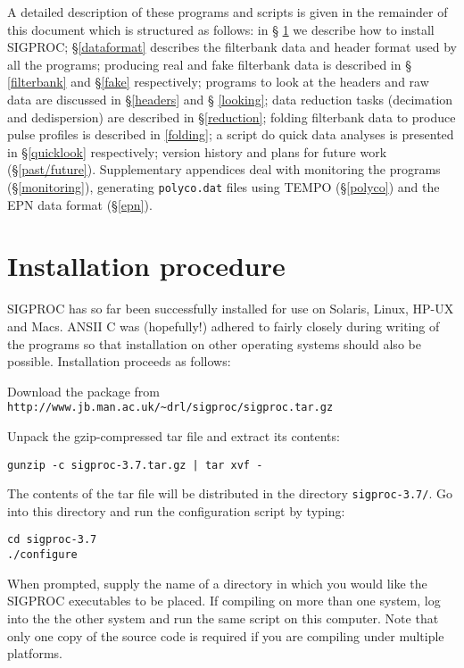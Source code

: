 \documentclass[11pt]{article}
\begin{document}
A detailed description of these programs and scripts is given in the
remainder of this document which is structured as follows: in \S
\ref{install} we describe how to install SIGPROC; \S \ref{dataformat}
describes the filterbank data and header format used by all the
programs; producing real and fake filterbank data is described in \S
\ref{filterbank} and \S \ref{fake} respectively; programs to look at
the headers and raw data are discussed in \S \ref{headers} and \S
\ref{looking}; data reduction tasks (decimation and dedispersion) are
described in \S \ref{reduction}; folding filterbank data to produce
pulse profiles is described in \ref{folding}; a script do quick data
analyses is presented in \S \ref{quicklook} respectively; version
history and plans for future work (\S \ref{past/future}). 
Supplementary appendices deal with
monitoring the programs (\S \ref{monitoring}), 
generating {\tt polyco.dat} files using {\sc TEMPO}
(\S \ref{polyco}) and the EPN data format (\S \ref{epn}).

\section{Installation procedure}
\label{install}
SIGPROC has so far been successfully installed for use on Solaris,
Linux, HP-UX and Macs.
ANSII C was (hopefully!)  adhered to fairly closely
during writing of the programs so that installation on other operating
systems should also be possible.  Installation proceeds as follows:

Download the package from 
\verb+http://www.jb.man.ac.uk/~drl/sigproc/sigproc.tar.gz+

Unpack the gzip-compressed tar file and extract its contents:

\noindent 
{\tt gunzip -c sigproc-3.7.tar.gz | tar xvf -}

The contents of the tar file will be distributed in the directory
{\tt sigproc-3.7/}. Go into this directory and run the configuration
script by typing: 

\noindent
{\tt cd sigproc-3.7}\\
{\tt ./configure}

\noindent
When prompted, supply the name
of a directory in which you would like the SIGPROC executables to
be placed.
If compiling on more than one system, log into the the other system
and run the same script on this computer.
Note that only one copy of the source code is required
if you are compiling under multiple platforms.
\end{document}
